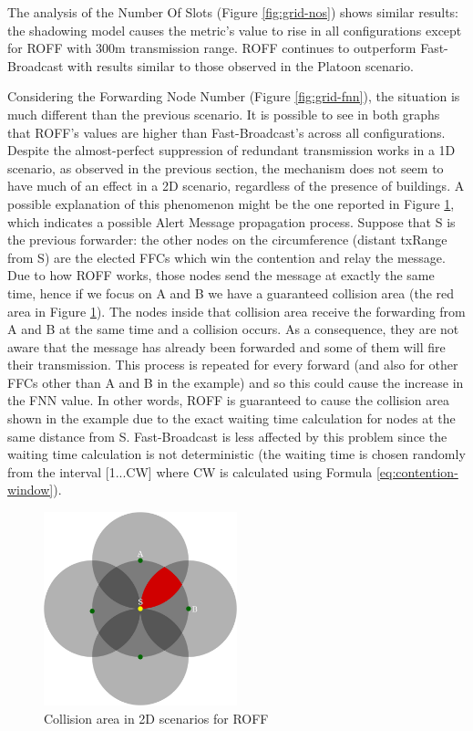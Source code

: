 		
		The analysis of the Number Of Slots (Figure \ref{fig:grid-nos}) shows similar results: the shadowing model causes the metric's value to rise in all configurations except for ROFF with 300m transmission range. ROFF continues to outperform Fast-Broadcast with results similar to those observed in the Platoon scenario. 
		
		
		Considering the Forwarding Node Number (Figure \ref{fig:grid-fnn}), the situation is much different than the previous scenario. It is possible to see in both graphs that ROFF's values are higher than Fast-Broadcast's across all configurations. Despite the almost-perfect suppression of redundant transmission works in a 1D scenario, as observed in the previous section, the mechanism does not seem to have much of an effect in a 2D scenario, regardless of the presence of buildings. A possible explanation of this phenomenon might be the one reported in Figure \ref{fig:2d-roff}, which indicates a possible Alert Message propagation process. Suppose that S is the previous forwarder: the other nodes on the circumference (distant txRange from S) are the elected FFCs which win the contention and relay the message. Due to how ROFF works, those nodes send the message at exactly the same time, hence if we focus on A and B we have a guaranteed collision area (the red area in Figure \ref{fig:2d-roff}). The nodes inside that collision area receive the forwarding from A and B at the same time and a collision occurs. As a consequence, they are not aware that the message has already been forwarded and some of them will fire their transmission. This process is repeated for every forward (and also for other FFCs other than A and B in the example) and so this could cause the increase in the FNN value. In other words, ROFF is guaranteed to cause the collision area shown in the example due to the exact waiting time calculation for nodes at the same distance from S. Fast-Broadcast is less affected by this problem since the waiting time calculation is not deterministic (the waiting time is chosen randomly from the interval [1...CW] where CW is calculated using Formula \ref{eq:contention-window}).
	
		\begin{figure}[H]
			\centering
			\includegraphics[width=0.5\textwidth]{immagini/2d-roff}
			\caption{Collision area in 2D scenarios for ROFF}
			\label{fig:2d-roff}
		\end{figure}


